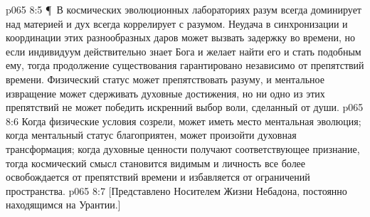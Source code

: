 \vs p065 8:5 \P\ В космических эволюционных лабораториях разум всегда доминирует над материей и дух всегда коррелирует с разумом. Неудача в синхронизации и координации этих разнообразных даров может вызвать задержку во времени, но если индивидуум действительно знает Бога и желает найти его и стать подобным ему, тогда продолжение существования гарантировано независимо от препятствий времени. Физический статус может препятствовать разуму, и ментальное извращение может сдерживать духовные достижения, но ни одно из этих препятствий не может победить искренний выбор воли, сделанный от души.
\vs p065 8:6 Когда физические условия созрели, может иметь место  ментальная эволюция; когда ментальный статус благоприятен, может произойти  духовная трансформация; когда духовные ценности получают соответствующее признание, тогда космический смысл становится видимым и личность все более освобождается от препятствий времени и избавляется от ограничений пространства.
\vs p065 8:7 [Представлено Носителем Жизни Небадона, постоянно находящимся на Урантии.]
